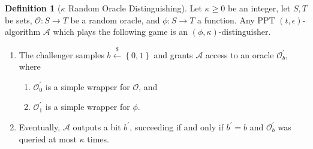 \documentclass[11pt]{article}
\theoremstyle{definition}
\newtheorem{definition}[definition]{Definition}
\newcommand{\sample}{\overset{\$}{\leftarrow}}
\begin{document}
\begin{definition}[$\kappa$ Random Oracle Distinguishing]\label{def:distinguisher}
Let $\kappa \geq 0$ be an integer, let $S, T$ be sets, $\mathcal{O}:S \to T$ be a random oracle, and $\phi: S \to T$ a function. Any PPT $(t,\epsilon)$-algorithm $\mathcal{A}$ which plays the following game is an $(\phi,\kappa)$-distinguisher.
\begin{enumerate}
\item The challenger samples $b \sample \left\{0,1\right\}$ and grants $\mathcal{A}$ access to an oracle $\mathcal{O}^\prime_b$, where 
\begin{enumerate}
\item $\mathcal{O}^\prime_0$ is a simple wrapper for $\mathcal{O}$, and
\item $\mathcal{O}^\prime_1$ is a simple wrapper for $\phi$.
\end{enumerate}
\item Eventually, $\mathcal{A}$ outputs a bit $b^\prime$, succeeding if and only if $b^\prime = b$ and $\mathcal{O}^\prime_b$ was queried at most $\kappa$ times.
\end{enumerate}
\end{definition}
\end{document}
